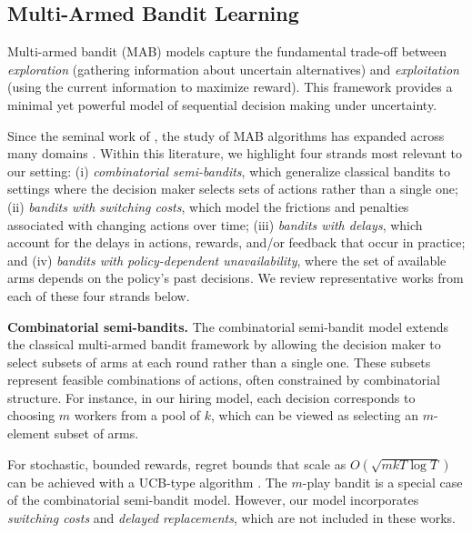 \documentclass[opre,blindrev]{informs3}
\begin{document}
\subsection{Multi-Armed Bandit Learning}\label{sec:bandit-related-work}
Multi-armed bandit (MAB) models capture the fundamental trade-off between \emph{exploration} (gathering information about uncertain alternatives) and \emph{exploitation} (using the current information to maximize reward). This framework provides a minimal yet powerful model of sequential decision making under uncertainty. 

Since the seminal work of \cite{lai1985asymptotically}, the study of MAB algorithms has expanded across many domains \citep{bouneffouf2020survey}.
Within this literature, we highlight four strands most relevant to our setting: (i) \emph{combinatorial semi-bandits}, which generalize classical bandits to settings where the decision maker selects sets of actions rather than a single one; (ii) \emph{bandits with switching costs}, which model the frictions and penalties associated with changing actions over time; (iii) \emph{bandits with delays}, which account for the delays in actions, rewards, and/or feedback that occur in practice; and (iv) \emph{bandits with policy-dependent unavailability}, where the set of available arms depends on the policy's past decisions. We review representative works from each of these four strands below. 

{\bf Combinatorial semi-bandits.}
The combinatorial semi-bandit model \cite{cesa2012combinatorial, chen2013combinatorial} extends the classical multi-armed bandit framework by allowing the decision maker to select subsets of arms at each round rather than a single one. These subsets represent feasible combinations of actions, often constrained by combinatorial structure. For instance, in our hiring model, each decision corresponds to choosing \(m\) workers from a pool of \(k\), which can be viewed as selecting an \(m\)-element subset of arms.

For stochastic, bounded rewards, regret bounds that scale as \(O(\sqrt{mkT\log T})\) can be achieved with a UCB-type algorithm \citep{kveton2015tight}. The \(m\)-play bandit is a special case of the combinatorial semi-bandit model. However, our model incorporates \emph{switching costs} and \emph{delayed replacements}, which are not included in these works. 
\end{document}

